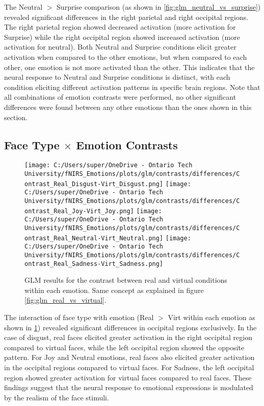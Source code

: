 The Neutral $>$ Surprise comparison (as shown in \ref{fig:glm_neutral_vs_surprise}) revealed significant differences in the right parietal and right occipital regions. 
The right parietal region showed decreased activation (more activation for Surprise) while the right occipital region showed increased activation (more activation for neutral).
Both Neutral and Surprise conditions elicit greater activation when compared to the other emotions, but when compared to each other, one emotion is not more activated than the other.
This indicates that the neural response to Neutral and Surprise conditions is distinct, with each condition eliciting different activation patterns in specific brain regions.
Note that all combinations of emotion contrasts were performed, no other significant differences were found between any other emotions than the ones shown in this section.

\subsection{Face Type \texorpdfstring{$\times$}{x} Emotion Contrasts}
\begin{figure}[H]
  \centering
  \texttt{[image: C:/Users/super/OneDrive - Ontario Tech University/fNIRS\_Emotions/plots/glm/contrasts/differences/Contrast\_Real\_Disgust-Virt\_Disgust.png]}
  \texttt{[image: C:/Users/super/OneDrive - Ontario Tech University/fNIRS\_Emotions/plots/glm/contrasts/differences/Contrast\_Real\_Joy-Virt\_Joy.png]}
  \texttt{[image: C:/Users/super/OneDrive - Ontario Tech University/fNIRS\_Emotions/plots/glm/contrasts/differences/Contrast\_Real\_Neutral-Virt\_Neutral.png]}
  \texttt{[image: C:/Users/super/OneDrive - Ontario Tech University/fNIRS\_Emotions/plots/glm/contrasts/differences/Contrast\_Real\_Sadness-Virt\_Sadness.png]}
  \caption[GLM: Face Type \texorpdfstring{$\times$}{x} Emotion Contrasts]{GLM results for the contrast between real and virtual conditions within each emotion.
  Same concept as explained in figure \ref{fig:glm_real_vs_virtual}. }
  \label{fig:glm_real_vs_virtual_emotion_analysis}
\end{figure}

The interaction of face type with emotion (Real $>$ Virt within each emotion as shown in \ref{fig:glm_real_vs_virtual_emotion_analysis}) revealed significant differences in occipital regions exclusively.
In the case of disgust, real faces elicited greater activation in the right occipital region compared to virtual faces, while the left occipital region showed the opposite pattern.
For Joy and Neutral emotions, real faces also elicited greater activation in the occipital regions compared to virtual faces.
For Sadness, the left occipital region showed greater activation for virtual faces compared to real faces.
These findings suggest that the neural response to emotional expressions is modulated by the realism of the face stimuli. 

